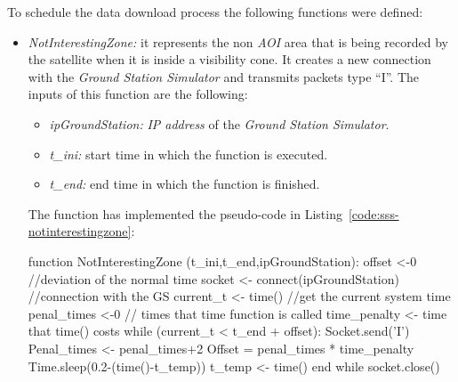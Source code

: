 To schedule the data download process the following functions were defined:
\begin{itemize}
\item \emph{NotInterestingZone:}  it represents the non \emph{AOI} area that is
  being recorded by the satellite when it is inside a visibility cone. It
  creates a new connection with the \emph{Ground Station Simulator} and
  transmits packets type ``I''. The inputs of this function are the following:
\begin{itemize}
\item \emph{ipGroundStation:} \emph{IP address} of the \emph{Ground Station Simulator}.
\item \emph{t\_ini:} start time in which the function is executed.
\item \emph{t\_end:} end time in which the function is finished.
\end{itemize}

The function has implemented the pseudo-code in Listing~\ref{code:sss-notinterestingzone}:

\begin{listing}[
  float=h!,
  caption  = {Pseudocode of \emph{NotInterestingZone} function},
  label    = code:sss-notinterestingzone,
style=customc]
function NotInterestingZone (t_ini,t_end,ipGroundStation):
offset <-0 //deviation of the normal time
socket <- connect(ipGroundStation) //connection with the GS
current_t <- time() //get the current system time
penal_times <-0 // times that time function is called
time_penalty <- time that time() costs
while (current_t  <  t_end + offset):
	Socket.send('I')
	Penal_times <- penal_times+2
	Offset = penal_times * time_penalty
	Time.sleep(0.2-(time()-t_temp))
	t_temp <- time()
end while
socket.close()
\end{listing}


\end{itemize}
